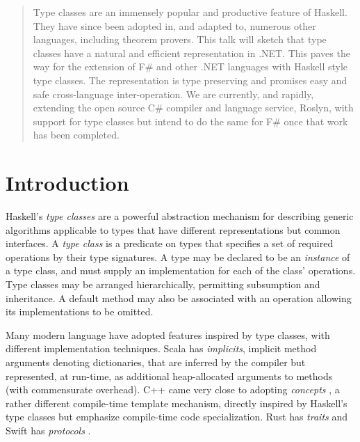 \documentclass[preprint]{sig-alternate-05-2015}
\begin{document}
\makeatletter
\def\@copyrightspace{\relax}
\makeatother



\maketitle
\begin{abstract}
Type classes are an immensely popular and productive feature of Haskell. They have since been adopted in, and adapted to, numerous other languages, including theorem provers.
This talk will sketch that type classes have a natural and efficient representation in .NET. 
This paves the way for the extension of F\# and other .NET languages with Haskell style type classes. 
The representation is type preserving and promises easy and safe cross-language inter-operation.
We are currently, and rapidly, extending the open source C\# compiler and language service, Roslyn, with support for type classes but intend to
do the same for F\# once that work has been completed.
\end{abstract}





\section{Introduction}


Haskell's \emph{type classes} \cite{peytonjones:h98,WadlerBlott} are a powerful abstraction mechanism for describing generic algorithms applicable to types that have different representations but common interfaces.
A \emph{type class} is a predicate on types that specifies a set of required operations by their type signatures.
A type may be declared to be an \emph{instance} of a type class, and must supply an implementation for each of the class' operations. 
Type classes may be arranged hierarchically, permitting subsumption and inheritance. A default method may also be associated with an operation allowing its implementations to be omitted.

Many modern language have adopted features inspired
by type classes, with different implementation techniques.  Scala has
\emph{implicits}\cite{scalaimplicits}, implicit method arguments denoting dictionaries, that
are inferred by the compiler but represented, at run-time, as additional
heap-allocated arguments to methods (with commensurate overhead).  C++ came very
close to adopting \emph{concepts} \cite{cppconcepts}, a rather different compile-time template mechanism, 
directly inspired by Haskell's type classes but emphasize compile-time code specialization. Rust has \emph{traits} \cite{Rust} and Swift has
\emph{protocols} \cite{Swift}.
\end{document}
